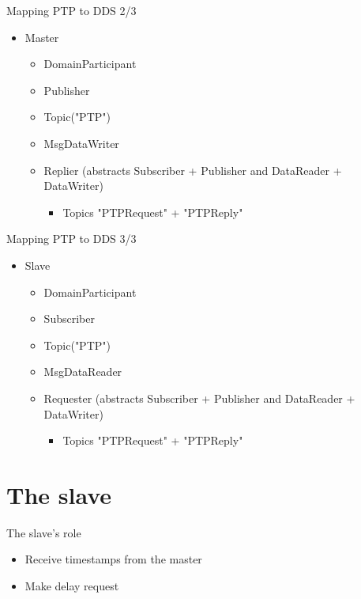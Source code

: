 \documentclass[compressed, presentation, notheorems, 12pt]{beamer}
\begin{document}
\begin{frame}{Mapping PTP to DDS 2/3}
\begin{itemize}
	\item Master
	\begin{itemize}
		\item DomainParticipant
		\item  Publisher
		\item Topic("PTP")
		\item MsgDataWriter
		\item Replier (abstracts Subscriber + Publisher and DataReader + DataWriter)
		\begin{itemize}
			\item  Topics "PTPRequest" + "PTPReply"
		\end{itemize}
	\end{itemize}
\end{itemize}
\end{frame}



\begin{frame}{Mapping PTP to DDS 3/3}
\begin{itemize}
	\item Slave
	\begin{itemize}
		\item DomainParticipant
		\item  Subscriber
		\item Topic("PTP")
		\item MsgDataReader
		\item Requester (abstracts Subscriber + Publisher and DataReader + DataWriter)
		\begin{itemize}
			\item  Topics "PTPRequest" + "PTPReply"
		\end{itemize}
	\end{itemize}
\end{itemize}
\end{frame}
	
\section{The slave}
	\begin{frame}{The slave's role}	

	\begin{itemize}
		\item Receive timestamps from the master
		\item Make delay request
	\end{itemize}
	
	\end{frame}
\end{document}
